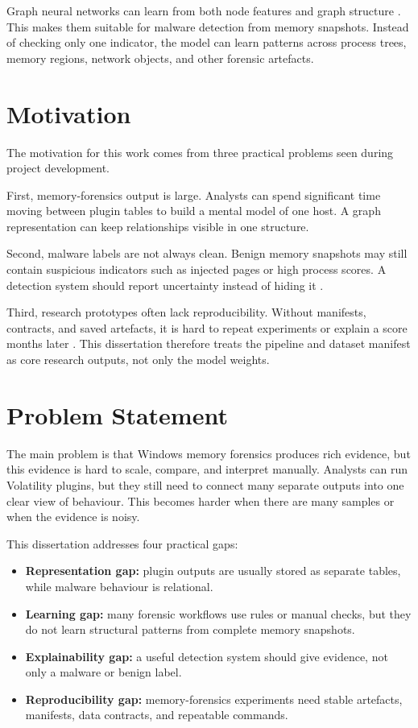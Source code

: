 Graph neural networks can learn from both node features and graph structure \cite{hamilton2020graph}. This makes them suitable for malware detection from memory snapshots. Instead of checking only one indicator, the model can learn patterns across process trees, memory regions, network objects, and other forensic artefacts.

\section{Motivation}

The motivation for this work comes from three practical problems seen during project development.

First, memory-forensics output is large. Analysts can spend significant time moving between plugin tables to build a mental model of one host. A graph representation can keep relationships visible in one structure.

Second, malware labels are not always clean. Benign memory snapshots may still contain suspicious indicators such as injected pages or high process scores. A detection system should report uncertainty instead of hiding it \cite{guo2017calibration}.

Third, research prototypes often lack reproducibility. Without manifests, contracts, and saved artefacts, it is hard to repeat experiments or explain a score months later \cite{goodman2016reproducibility}. This dissertation therefore treats the pipeline and dataset manifest as core research outputs, not only the model weights.

\section{Problem Statement}

The main problem is that Windows memory forensics produces rich evidence, but this evidence is hard to scale, compare, and interpret manually. Analysts can run Volatility plugins, but they still need to connect many separate outputs into one clear view of behaviour. This becomes harder when there are many samples or when the evidence is noisy.

This dissertation addresses four practical gaps:

\begin{itemize}
\item \textbf{Representation gap:} plugin outputs are usually stored as separate tables, while malware behaviour is relational.
\item \textbf{Learning gap:} many forensic workflows use rules or manual checks, but they do not learn structural patterns from complete memory snapshots.
\item \textbf{Explainability gap:} a useful detection system should give evidence, not only a malware or benign label.
\item \textbf{Reproducibility gap:} memory-forensics experiments need stable artefacts, manifests, data contracts, and repeatable commands.
\end{itemize}


